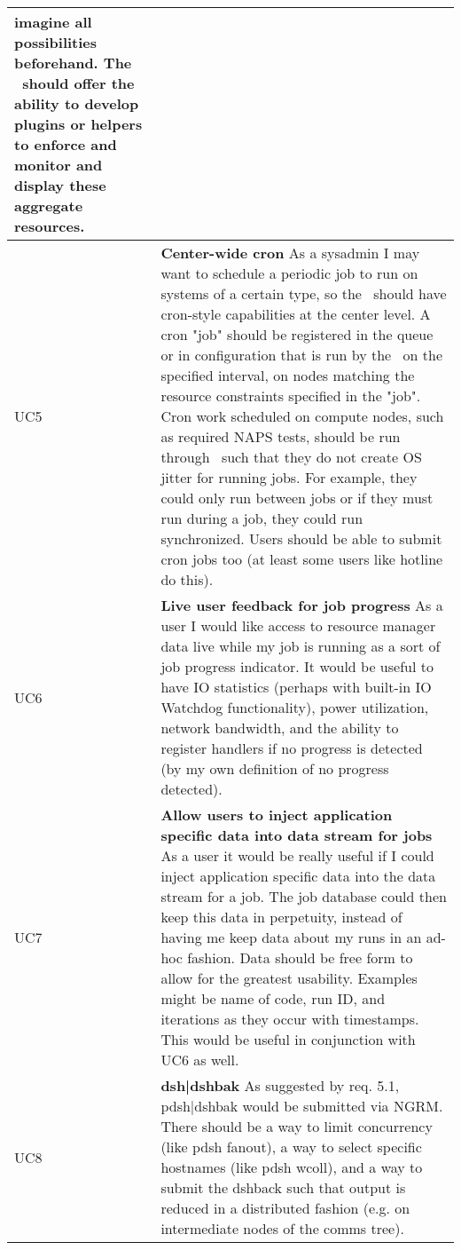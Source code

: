 \begin{longtable}{|p{1cm}|p{15cm}|}
	imagine all possibilities beforehand. The \ngrm\ should offer the
	ability to develop plugins or helpers to enforce and monitor and
	display these aggregate resources.\\
  \hline
  UC5 & \textbf{Center-wide cron}\newline
	As a sysadmin I may want to schedule a periodic job to run on
	systems of a certain type, so the \ngrm\ should have cron-style
	capabilities at the center level. A cron "job" should be registered
	in the queue or in configuration that is run by the \ngrm\ on the
	specified interval, on nodes matching the resource constraints
	specified in the "job". Cron work scheduled on compute nodes, such
	as required NAPS tests, should be run through \ngrm\ such that they
	do not create OS jitter for running jobs. For example, they could
	only run between jobs or if they must run during a job, they could
	run synchronized. Users should be able to submit cron jobs too (at
	least some users like hotline do this).\\
  \hline
  UC6 & \textbf{Live user feedback for job progress}\newline
	As a user I would like access to resource manager data live while my
	job is running as a sort of job progress indicator. It would be useful
	to have IO statistics (perhaps with built-in IO Watchdog
	functionality), power utilization, network bandwidth, and the ability
	to register handlers if no progress is detected (by my own definition
	of no progress detected).\\
  \hline
  UC7 & \textbf{Allow users to inject application specific data into
	data stream for jobs}\newline
	As a user it would be really useful if I could inject application
	specific data into the data stream for a job. The job database could
	then keep this data in perpetuity, instead of having me keep data
	about my runs in an ad-hoc fashion. Data should be free form to allow
	for the greatest usability. Examples might be name of code, run ID,
	and iterations as they occur with timestamps. This would be useful in
	conjunction with UC6 as well.\\
  \hline
  UC8 & \textbf{dsh|dshbak}\newline
	As suggested by req. 5.1, pdsh|dshbak would be submitted via NGRM.
	There should be a way to limit concurrency (like pdsh fanout), a way
	to select specific hostnames (like pdsh wcoll), and a way to submit
	the dshback such that output is reduced in a distributed fashion
	(e.g. on intermediate nodes of the comms tree).\\

\end{longtable}
